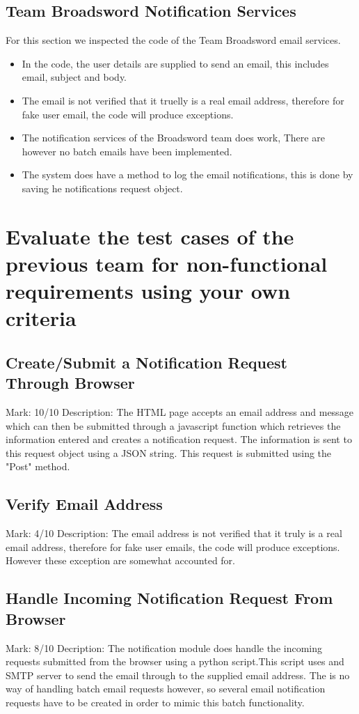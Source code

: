 \documentclass[11pt]{article}
\begin{document}
	\subsection{Team Broadsword Notification Services}
	For this section we inspected the code of the Team Broadsword email services.
	\begin{itemize}
		\item In the code, the user details are supplied to send an email, this includes email, subject and body. 
		\item The email is not verified that it truelly is a real email address, therefore for fake user email, the code will produce exceptions. 
		\item The notification services of the Broadsword team does work, There are however no batch emails have been implemented.
		\item The system does have a method to log the email notifications, this is done by saving he notifications request object.  
	\end{itemize}
	
\section{Evaluate the test cases of the previous team for non-functional requirements using your own criteria}	

	\subsection{Create/Submit a Notification Request Through Browser} 
		Mark: 10/10
		Description: The HTML page accepts an email address and message which can then be submitted through a javascript function which retrieves the information entered and creates a notification request. The information is sent to this request object using a JSON string. This request is submitted using the "Post" method.
		

	\subsection{Verify Email Address} 
		Mark: 4/10
		Description: The email address is not verified that it truly is a real email address, therefore for fake user emails, the code will produce exceptions. However these exception are somewhat accounted for.
		

	\subsection{Handle Incoming Notification Request From Browser}
		Mark: 8/10
		Decription: The notification module does handle the incoming requests submitted from the browser using a python script.This script uses and SMTP server to send the email through to the supplied email address. The is no way of handling batch email requests however, so several email notification requests have to be created in order to mimic this batch functionality.
		
\end{document}
